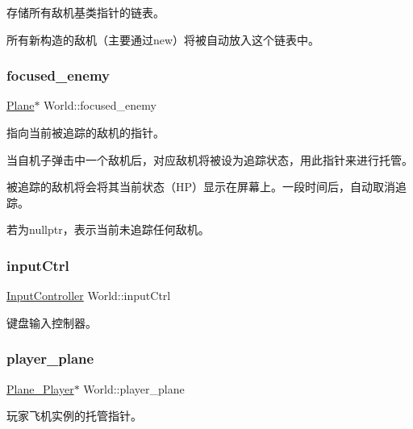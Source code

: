 存储所有敌机基类指针的链表。 

所有新构造的敌机（主要通过new）将被自动放入这个链表中。 \mbox{\label{class_world_ac8553c1be4fb1e79e94bf9f63f834963}} 
\subsubsection{\texorpdfstring{focused\+\_\+enemy}{focused\_enemy}}
{\footnotesize\ttfamily \hyperlink{class_plane}{Plane}$\ast$ World\+::focused\+\_\+enemy}



指向当前被追踪的敌机的指针。 

当自机子弹击中一个敌机后，对应敌机将被设为追踪状态，用此指针来进行托管。

被追踪的敌机将会将其当前状态（\+H\+P）显示在屏幕上。一段时间后，自动取消追踪。

若为nullptr，表示当前未追踪任何敌机。 \mbox{\label{class_world_ae4cc86850d7092edbb7648d4cbd093aa}} 
\subsubsection{\texorpdfstring{input\+Ctrl}{inputCtrl}}
{\footnotesize\ttfamily \hyperlink{class_input_controller}{Input\+Controller} World\+::input\+Ctrl}



键盘输入控制器。 

\mbox{\label{class_world_ada7a87d1778bfc543635656ea8f12d3f}} 
\subsubsection{\texorpdfstring{player\+\_\+plane}{player\_plane}}
{\footnotesize\ttfamily \hyperlink{class_plane___player}{Plane\+\_\+\+Player}$\ast$ World\+::player\+\_\+plane}



玩家飞机实例的托管指针。 

\mbox{\label{class_world_ad9027ba6a4913c21191e7321e9bb2f9f}} 
